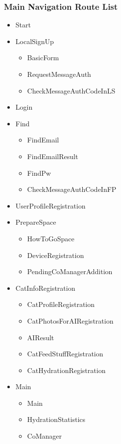 \documentclass[conference]{IEEEtran}
\begin{document}
\subsubsection{Main Navigation Route List}
\begin{itemize}
    \item Start
    \item LocalSignUp
    \begin{itemize}
        \item BasicForm
        \item RequestMessageAuth
        \item CheckMessageAuthCodeInLS
    \end{itemize}
    \item Login
    \item Find
    \begin{itemize}
        \item FindEmail
        \item FindEmailResult
        \item FindPw
        \item CheckMessageAuthCodeInFP
    \end{itemize}
    \item UserProfileRegistration
    \item PrepareSpace
    \begin{itemize}
        \item HowToGoSpace
        \item DeviceRegistration
        \item PendingCoManagerAddition
    \end{itemize}
    \item CatInfoRegistration
    \begin{itemize}
        \item CatProfileRegistration
        \item CatPhotosForAIRegistration
        \item AIResult
        \item CatFeedStuffRegistration
        \item CatHydrationRegistration
    \end{itemize}
    \item Main
    \begin{itemize}
        \item Main
        \item HydrationStatistics
        \item CoManager\\
    \end{itemize}
\end{itemize}
\end{document}
